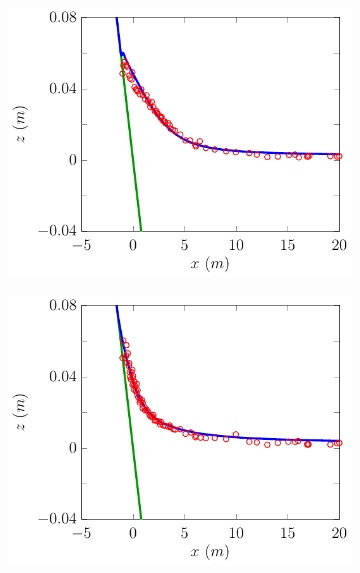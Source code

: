 \begin{figure}
\begin{subfigure}{0.5\textwidth}
	\end{subfigure}
	\begin{subfigure}{0.5\textwidth}
		\includegraphics[width=\textwidth]{./chp6/figures/Experiment/Synolakis/H0p0185/FEVM/50s.pdf}
	\end{subfigure}%
	\begin{subfigure}{0.5\textwidth}
		\includegraphics[width=\textwidth]{./chp6/figures/Experiment/Synolakis/H0p0185/FEVM/60s.pdf}
			\end{subfigure}
	\begin{subfigure}{0.5\textwidth}

\end{subfigure}
\end{figure}
